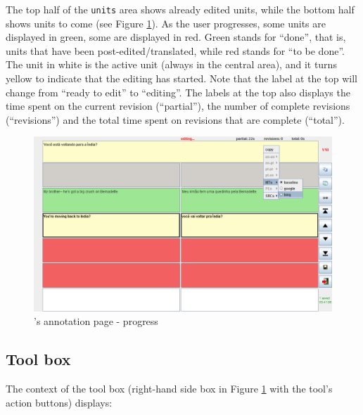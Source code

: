 The top half of the {\tt units} area shows already edited units, while the bottom half shows units to come (see Figure \ref{fig:progress}).
As the user progresses, some units are displayed in green, some are displayed in red. Green stands for ``done'', that is, units that have been post-edited/translated, %
while red stands for ``to be done''.
The unit in white is the active unit (always in the central area), and it turns yellow to indicate that the editing has started. Note that the label at the top will change from ``ready to edit'' to ``editing''.
The labels at the top also displays the time spent on the current revision (``partial''), the number of complete revisions (``revisions'') and the total time spent on revisions that are complete (``total'').

\begin{figure}[h]\label{fig:progress}
\includegraphics[width=1\textwidth]{img/annotation-progress}
\caption{\PET's annotation page - progress}
\end{figure}

\subsection{Tool box}\label{sec:toolbox}

The context of the tool box (right-hand side box in Figure \ref{fig:progress} with the tool's action buttons) %
displays:

